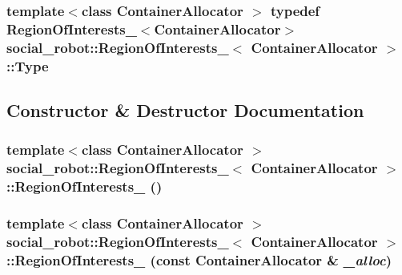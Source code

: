 \label{structsocial__robot_1_1RegionOfInterests___affa13225dd210fc9f022418ff1a77c44}
\hypertarget{structsocial__robot_1_1RegionOfInterests___a7c9c9ece4c1a37cadea3ef6e9ba913c2}{
\subsubsection[{Type}]{\setlength{\rightskip}{0pt plus 5cm}template$<$class ContainerAllocator $>$ typedef {\bf RegionOfInterests\_\-}$<$ContainerAllocator$>$ {\bf social\_\-robot::RegionOfInterests\_\-}$<$ ContainerAllocator $>$::{\bf Type}}}
\label{structsocial__robot_1_1RegionOfInterests___a7c9c9ece4c1a37cadea3ef6e9ba913c2}


\subsection{Constructor \& Destructor Documentation}
\hypertarget{structsocial__robot_1_1RegionOfInterests___a8e3719b7289040dbce91029308426d1d}{
\subsubsection[{RegionOfInterests\_\-}]{\setlength{\rightskip}{0pt plus 5cm}template$<$class ContainerAllocator $>$ {\bf social\_\-robot::RegionOfInterests\_\-}$<$ ContainerAllocator $>$::{\bf RegionOfInterests\_\-} ()}}
\label{structsocial__robot_1_1RegionOfInterests___a8e3719b7289040dbce91029308426d1d}
\hypertarget{structsocial__robot_1_1RegionOfInterests___a1eeaf1724e711d7badb84b6548cf78bf}{
\subsubsection[{RegionOfInterests\_\-}]{\setlength{\rightskip}{0pt plus 5cm}template$<$class ContainerAllocator $>$ {\bf social\_\-robot::RegionOfInterests\_\-}$<$ ContainerAllocator $>$::{\bf RegionOfInterests\_\-} (const ContainerAllocator \& {\em \_\-alloc})}}
\label{structsocial__robot_1_1RegionOfInterests___a1eeaf1724e711d7badb84b6548cf78bf}


